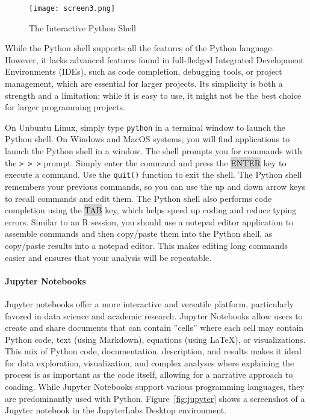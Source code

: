 \begin{figure}
\centering
\texttt{[image: screen3.png]}
\caption{The Interactive Python Shell}
\label{fig:pythonshell}
\end{figure}

While the Python shell supports all the features of the Python language. However, it lacks advanced features found in full-fledged Integrated Development Environments (IDEs), such as code completion, debugging tools, or project management, which are essential for larger projects. Its simplicity is both a strength and a limitation: while it is easy to use, it might not be the best choice for larger programming projects.

On Unbuntu Linux, simply type \texttt{python} in a terminal window to launch the Python shell. On Windows and MacOS systems, you will find applications to launch the Python shell in a window. The shell prompts you for commands with the \texttt{> > >} prompt. Simply enter the command and press the \colorbox{lightgray}{ENTER} key to execute a command. Use the \texttt{quit()} function to exit the shell. The Python shell remembers your previous commands, so you can use the up and down arrow keys to recall commands and edit them. The Python shell also performs code completion using the \colorbox{lightgray}{TAB} key, which helps speed up coding and reduce typing errors. Similar to an R session, you should use a notepad editor application to assemble commands and then copy/paste them into the Python shell, as copy/paste results into a notepad editor. This makes editing long commands easier and ensures that your analysis will be repeatable.


\paragraph*{Jupyter Notebooks} Jupyter notebooks offer a more interactive and versatile platform, particularly favored in data science and academic research. Jupyter Notebooks allow users to create and share documents that can contain ''cells'' where each cell may contain Python code, text (using Markdown), equations (using LaTeX), or visualizations. This mix of Python code, documentation, description, and results makes it ideal for data exploration, visualization, and complex analyses where explaining the process is as important as the code itself, allowing for a narrative approach to coading. While Jupyter Notebooks support various programming languages, they are predominantly used with Python. Figure~\ref{fig:jupyter} shows a screenshot of a Jupyter notebook in the JupyterLabs Desktop environment.

